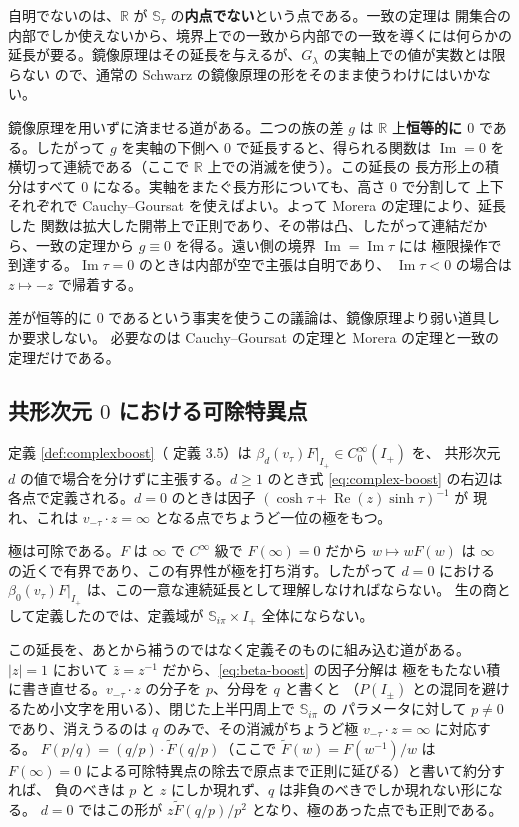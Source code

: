 \documentclass[11pt,a4paper]{article}
\newcommand{\Strip}{\mathbb{S}}
\newcommand{\abs}[1]{\lvert #1 \rvert}
\theoremstyle{definition}
\begin{document}
自明でないのは、$\mathbb{R}$ が $\Strip_\tau$ の\textbf{内点でない}という点である。一致の定理は
開集合の内部でしか使えないから、境界上での一致から内部での一致を導くには何らかの
延長が要る。鏡像原理はその延長を与えるが、$G_\lambda$ の実軸上での値が実数とは限らない
ので、通常の Schwarz の鏡像原理の形をそのまま使うわけにはいかない。

鏡像原理を用いずに済ませる道がある。二つの族の差 $g$ は $\mathbb{R}$ 上\textbf{恒等的に $0$}
である。したがって $g$ を実軸の下側へ $0$ で延長すると、得られる関数は
$\operatorname{Im} = 0$ を横切って連続である（ここで $\mathbb{R}$ 上での消滅を使う）。この延長の
長方形上の積分はすべて $0$ になる。実軸をまたぐ長方形についても、高さ $0$ で分割して
上下それぞれで Cauchy--Goursat を使えばよい。よって Morera の定理により、延長した
関数は拡大した開帯上で正則であり、その帯は凸、したがって連結だから、一致の定理から
$g \equiv 0$ を得る。遠い側の境界 $\operatorname{Im} = \operatorname{Im}\tau$ には
極限操作で到達する。$\operatorname{Im}\tau = 0$ のときは内部が空で主張は自明であり、
$\operatorname{Im}\tau < 0$ の場合は $z \mapsto -z$ で帰着する。

差が恒等的に $0$ であるという事実を使うこの議論は、鏡像原理より弱い道具しか要求しない。
必要なのは Cauchy--Goursat の定理と Morera の定理と一致の定理だけである。

\subsection{\texorpdfstring{共形次元 $0$ における可除特異点}{共形次元 0 における可除特異点}}
\label{sec:d0}

定義 \ref{def:complexboost}（\cite{T26} 定義 3.5）は $\beta_d(v_\tau)F|_{I_+} \in C_0^\infty(I_+)$ を、
共形次元 $d$ の値で場合を分けずに主張する。$d \ge 1$ のとき式 \eqref{eq:complex-boost} の右辺は
各点で定義される。$d = 0$ のときは因子 $(\cosh\tau + \operatorname{Re}(z)\sinh\tau)^{-1}$ が
現れ、これは $v_{-\tau}\cdot z = \infty$ となる点でちょうど一位の極をもつ。

極は可除である。$F$ は $\infty$ で $C^\infty$ 級で $F(\infty) = 0$ だから $w \mapsto w F(w)$ は
$\infty$ の近くで有界であり、この有界性が極を打ち消す。したがって $d = 0$ における
$\beta_0(v_\tau)F|_{I_+}$ は、この一意な連続延長として理解しなければならない。
生の商として定義したのでは、定義域が $\Strip_{i\pi} \times I_+$ 全体にならない。

この延長を、あとから補うのではなく定義そのものに組み込む道がある。
$\abs{z} = 1$ において $\bar{z} = z^{-1}$ だから、\eqref{eq:beta-boost} の因子分解は
極をもたない積に書き直せる。$v_{-\tau}\cdot z$ の分子を $p$、分母を $q$ と書くと
（$P(I_\pm)$ との混同を避けるため小文字を用いる）、閉じた上半円周上で $\Strip_{i\pi}$ の
パラメータに対して $p \ne 0$ であり、消えうるのは $q$ のみで、その消滅がちょうど極 $v_{-\tau}\cdot z = \infty$ に対応する。
$F(p/q) = (q/p) \cdot \tilde{F}(q/p)$（ここで $\tilde{F}(w) = F(w^{-1})/w$ は
$F(\infty) = 0$ による可除特異点の除去で原点まで正則に延びる）と書いて約分すれば、
負のべきは $p$ と $z$ にしか現れず、$q$ は非負のべきでしか現れない形になる。
$d = 0$ ではこの形が $z \tilde{F}(q/p) / p^2$ となり、極のあった点でも正則である。
\end{document}
